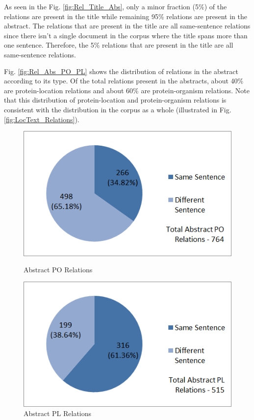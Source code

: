 As seen in the Fig. \ref{fig:Rel_Title_Abs}, only a minor fraction (5\%) of the relations are present in the title while remaining 95\% relations are present in the abstract. The relations that are present in the title are all same-sentence relations since there isn't a single document in the corpus where the title spans more than one sentence. Therefore, the 5\% relations that are present in the title are all same-sentence relations.

Fig. \ref{fig:Rel_Abs_PO_PL} shows the distribution of relations in the abstract according to its type. Of the total relations present in the abstracts, about 40\% are protein-location relations and about 60\% are protein-organism relations. Note that this distribution of protein-location and protein-organism relations is consistent with the distribution in the corpus as a whole (illustrated in Fig. \ref{fig:LocText_Relations}).

\begin{figure}
\centering
\begin{minipage}{.5\textwidth}
  \centering
  \includegraphics[width=.95\textwidth]{figures/AbsPORels_sent_Distribution.png}
  \caption{Abstract PO Relations}
  \label{fig:Abs_PO_Rel}
\end{minipage}%
\begin{minipage}{.5\textwidth}
  \centering
  \includegraphics[width=.95\textwidth]{figures/AbsPLRels_sent_Distribution.png}
  \caption{Abstract PL Relations}
  \label{fig:Abs_PL_Rel}
\end{minipage}
\end{figure}


